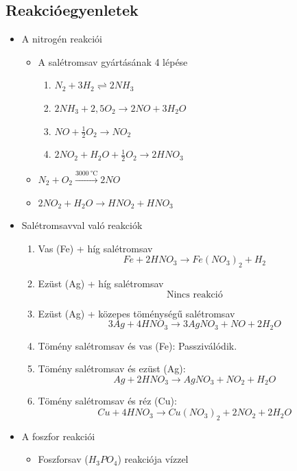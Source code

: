 \documentclass{article}
\begin{document}
\subsection{Reakcióegyenletek}
\begin{itemize}
    \item A nitrogén reakciói
    \begin{itemize}
        \item A salétromsav gyártásának 4 lépése
        \begin{enumerate}
            \item $N_2 + 3H_2 \rightleftharpoons 2NH_3$
            \item $2NH_3 + 2,5O_2 \rightarrow 2NO + 3H_2O$
            \item $NO + \frac{1}{2}O_2 \rightarrow NO_2$
            \item $2NO_2 + H_2O + \frac{1}{2}O_2 \rightarrow 2HNO_3$
        \end{enumerate}
        
        \item $N_2 + O_2 \xrightarrow{\SI{3000}{\degreeCelsius}} 2NO$
        \item $2NO_2 + H_2O \rightarrow HNO_2 + HNO_3$
    \end{itemize}

    \item Salétromsavval való reakciók
    \begin{enumerate}
        \item Vas (Fe) + híg salétromsav
        \[
            Fe + 2HNO_3 \rightarrow Fe(NO_3)_2 + H_2
        \]
        \item Ezüst (Ag) + híg salétromsav
        \[
        \text{Nincs reakció}
        \]
        \item Ezüst (Ag) + közepes töménységű salétromsav
        \[
            3Ag + 4HNO_3 \rightarrow 3AgNO_3 + NO + 2H_2O
        \]
        \item Tömény salétromsav és vas (Fe): Passziválódik.
        \item Tömény salétromsav és ezüst (Ag):
        \[
            Ag + 2HNO_3 \rightarrow AgNO_3 + NO_2 + H_2O
        \]
        \item Tömény salétromsav és réz (Cu):
        \[
            Cu + 4HNO_3 \rightarrow Cu(NO_3)_2 + 2NO_2 + 2H_2O
        \]
    \end{enumerate}

    \item A foszfor reakciói
    \begin{itemize}
        \item Foszforsav ($H_3PO_4$) reakciója vízzel


\end{itemize}
\end{itemize}
\end{document}
